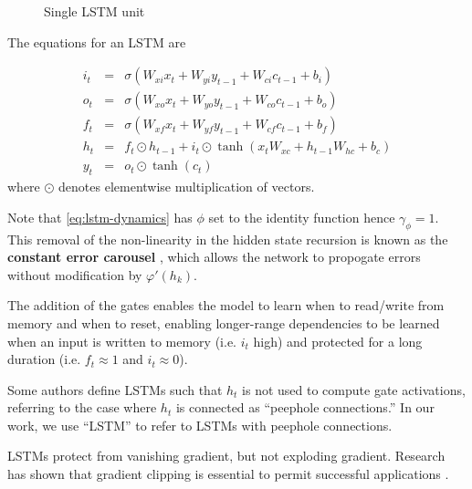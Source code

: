 \begin{figure}[htpb]
    \centering
    
    \caption{Single LSTM unit}
    \label{fig:lstm-unit}
\end{figure}

The equations for an LSTM are

\begin{eqnarray}
    i_t &=& \sigma(W_{xi} x_t + W_{yi} y_{t-1} + W_{ci} c_{t-1} + b_i) \\
    o_t &=& \sigma(W_{xo} x_t + W_{yo} y_{t-1} + W_{co} c_{t-1} + b_o) \\
    f_t &=& \sigma(W_{xf} x_t + W_{yf} y_{t-1} + W_{cf} c_{t-1} + b_f) \\
    h_t &=& f_t \odot h_{t-1} + i_t \odot \tanh(x_t W_{xc} + h_{t-1} W_{hc} + b_c) \label{eq:lstm-dynamics} \\
    y_t &=& o_t \odot \tanh(c_t)
\end{eqnarray}
where $\odot$ denotes elementwise multiplication of vectors.

Note that \autoref{eq:lstm-dynamics} has $\phi$ set to the identity function
hence $\gamma_\phi = 1$. This removal of the non-linearity in the hidden state
recursion is known as the \textbf{constant error carousel} , which
allows the network to propogate errors without modification by $\varphi'(h_k)$.

The addition of the gates enables the model to learn when to read/write from
memory and when to reset, enabling longer-range dependencies to be learned when
an input is written to memory (i.e. $i_t$ high) and protected for a long
duration (i.e. $f_t \approx 1$ and $i_t \approx 0$).

Some authors define LSTMs such that $h_t$ is not used to compute gate activations,
referring to the case where $h_t$ is connected as ``peephole connections.'' In our
work, we use ``LSTM'' to refer to LSTMs with peephole connections.

LSTMs protect from vanishing gradient, but not exploding gradient. Research has shown
that gradient clipping is essential to permit successful applications \cite{Pascanu2012}.
